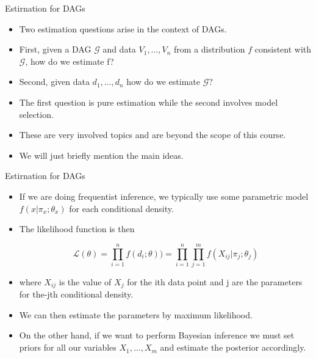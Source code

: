 \documentclass[handout]{beamer}
\begin{document}
\begin{frame}{Estirnation for DAGs}
\scriptsize{
\begin{itemize}
\item Two estimation questions arise in the context of DAGs. 
\item First, given a DAG $\mathcal{G}$ and data $V_1,\dots,V_n$ from a distribution $f$ consistent with $\mathcal{G}$, how do we estimate f?

\item Second, given data $d_1,\dots,d_n$ how do we estimate $\mathcal{G}$?

\item The first question is pure estimation while the second involves model selection.

\item These are very involved topics and are beyond the scope of this course.

\item We will just briefly mention the main ideas.

 
\end{itemize}



} 

\end{frame}


\begin{frame}{Estirnation for DAGs}
\scriptsize{
\begin{itemize}

\item If we are doing frequentist inference, we typically use some parametric model $f(x|\pi_x;\theta_x)$ for each conditional density. 

\item The likelihood function is then

\begin{displaymath}
 \mathcal{L}(\theta) = \prod_{i=1}^nf(d_i;\theta) ) =  \prod_{i=1}^n\prod_{j=1}^mf(X_{ij}|\pi_j;\theta_j) 
\end{displaymath}

\item where $X_{ij}$ is the value of $X_j$ for the ith data point and j are the parameters for the-jth conditional density. 

\item We can then estimate the parameters by maximum likelihood.

\item On the other hand, if we want to perform Bayesian inference we must set priors for all our variables $X_1,\dots,X_m$ and estimate the posterior accordingly.

 
\end{itemize}



} 

\end{frame}
\end{document}
